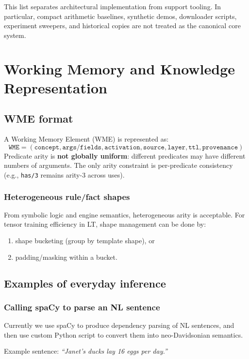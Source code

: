 \documentclass[14pt]{article}
\begin{document}
This list separates architectural implementation from support tooling.  In
particular, compact arithmetic baselines, synthetic demos, downloader scripts,
experiment sweepers, and historical copies are not treated as the canonical
core system.

\section{Working Memory and Knowledge Representation}

\subsection{WME format}
A Working Memory Element (WME) is represented as:
\[
\texttt{WME} = (\texttt{concept}, \texttt{args/fields}, \texttt{activation}, \texttt{source}, \texttt{layer}, \texttt{ttl}, \texttt{provenance})
\]
Predicate arity is \textbf{not globally uniform}: different predicates may have different numbers of arguments.
The only arity constraint is per-predicate consistency (e.g., \texttt{has/3} remains arity-3 across uses).

\subsubsection{Heterogeneous rule/fact shapes}
From symbolic logic and engine semantics, heterogeneous arity is acceptable.
For tensor training efficiency in LT, shape management can be done by:
\begin{enumerate}[leftmargin=1.5em]
  \item shape bucketing (group by template shape), or
  \item padding/masking within a bucket.
\end{enumerate}

\subsection{Examples of everyday inference}

\subsubsection{Calling spaCy to parse an NL sentence}

Currently we use spaCy to produce dependency parsing of NL sentences, and then use custom Python script to convert them into neo-Davidsonian semantics.

Example sentence: \textit{``Janet's ducks lay 16 eggs per day.''}
\end{document}
